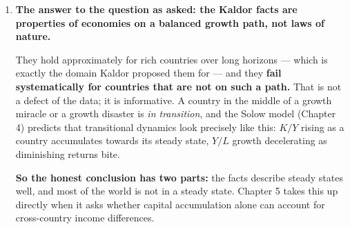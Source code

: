 \documentclass[12pt, letterpaper]{article}
\begin{document}
\begin{tcolorbox}[evenbox,title={Problem 3.2 \quad The Kaldor Facts in Other Countries}]
\begin{enumerate}
\begin{itemize}[leftmargin=1.3em,itemsep=4pt,topsep=2pt]
\item \textbf{Rich (e.g.\ France, Japan, Canada).} The facts should hold reasonably well
      --- this is the sample Kaldor generalised from. Expect a caveat: Japan's $K/Y$ rose
      substantially through its high-investment era and its growth rate is clearly \emph{not}
      constant (rapid to 1990, then flat), so ``constant growth'' holds only piecewise.
      Labour shares in most rich countries have \textbf{drifted down} since around 1980 ---
      a well-documented violation of fact 5 and an active research area.
\item \textbf{Middle-income (e.g.\ Brazil, Mexico, Thailand).} Expect the facts to hold
      \emph{much} worse. Brazil is a good case precisely because it fails so visibly: rapid
      growth to about 1980, then the lost decade, then stagnation. $\ln(Y/L)$ is not a
      straight line by any reading. $K/Y$ moves substantially.
\item \textbf{Poor (e.g.\ Madagascar, Congo, Malawi).} Expect the facts to fail badly.
      $\ln(Y/L)$ may be \emph{flat or falling} over decades. Data quality is also weakest
      here --- a point worth making explicitly rather than treating the series as gospel.
\end{itemize}

\item \textbf{The answer to the question as asked: the Kaldor facts are properties of
economies on a balanced growth path, not laws of nature.}

They hold approximately for rich countries over long horizons --- which is exactly the domain
Kaldor proposed them for --- and they \textbf{fail systematically for countries that are not
on such a path.} That is not a defect of the data; it is informative. A country in the middle
of a growth miracle or a growth disaster is \emph{in transition}, and the Solow model
(Chapter 4) predicts that transitional dynamics look precisely like this: $K/Y$ rising as a
country accumulates towards its steady state, $Y/L$ growth decelerating as diminishing
returns bite.

\textbf{So the honest conclusion has two parts:} the facts describe steady states well, and
most of the world is not in a steady state. Chapter 5 takes this up directly when it asks
whether capital accumulation alone can account for cross-country income differences.

\end{enumerate}


\end{tcolorbox}
\end{document}
